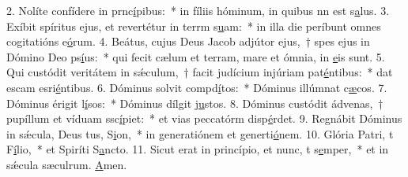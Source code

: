 2. Nolíte confídere in prnc\uline{í}pibus:~* in fíliis hóminum, in quibus nn est s\uline{a}lus.
3. Exíbit spíritus ejus, et revertétur in terrm s\uline{u}am:~* in illa die períbunt omnes cogitatións e\uline{ó}rum.
4. Beátus, cujus Deus Jacob adjútor ejus,~† spes ejus in Dómino Deo ps\uline{í}us:~* qui fecit cælum et terram, mare et ómnia,  in \uline{e}is sunt.
5. Qui custódit veritátem in sǽculum,~† facit judícium injúriam pat\uline{é}ntibus:~* dat escam esri\uline{é}ntibus.
6. Dóminus solvit compd\uline{í}tos:~* Dóminus illúmnat c\uline{æ}cos.
7. Dóminus érigit l\uline{í}sos:~* Dóminus dílgit j\uline{u}stos.
8. Dóminus custódit ádvenas,~† pupíllum et víduam ssc\uline{í}piet:~* et vias peccatórm disp\uline{é}rdet.
9. Regnábit Dóminus in sǽcula, Deus tus, S\uline{i}on,~* in generatiónem et generti\uline{ó}nem.
10. Glória Patri, t F\uline{í}lio,~* et Spiríti S\uline{a}ncto.
11. Sicut erat in princípio, et nunc, t s\uline{e}mper,~* et in sǽcula sæculrum. \uline{A}men.
